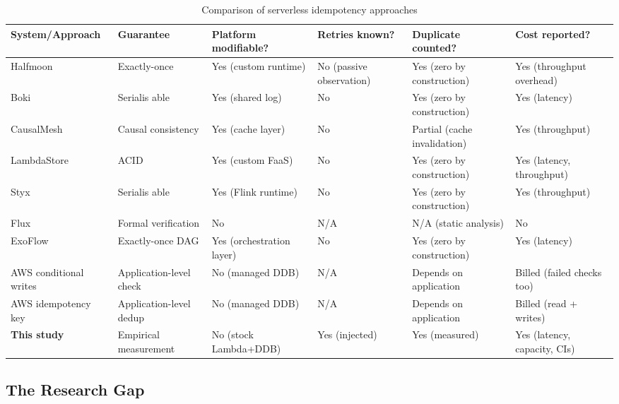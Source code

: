 \begin{table}[h]
\centering
\caption{Comparison of serverless idempotency approaches}
\label{tab:literature_comparison}
\begin{tabular}{p{3cm}p{3cm}p{2cm}p{2cm}p{2cm}p{2cm}}
\hline
\textbf{System/Approach} & \textbf{Guarantee} & \textbf{Platform modifiable?} & \textbf{Retries known?} & \textbf{Duplicate counted?} & \textbf{Cost reported?} \\
\hline
Halfmoon \citep{Qi2025Halfmoon} & Exactly-once & Yes (custom runtime) & No (passive observation) & Yes (zero by construction) & Yes (throughput overhead) \\
\hline
Boki \citep{Jia2024Boki} & Serialis able & Yes (shared log) & No & Yes (zero by construction) & Yes (latency) \\
\hline
CausalMesh \citep{Zhang2024CausalMesh} & Causal consistency & Yes (cache layer) & No & Partial (cache invalidation) & Yes (throughput) \\
\hline
LambdaStore \citep{Mast2026LambdaStore} & ACID & Yes (custom FaaS) & No & Yes (zero by construction) & Yes (latency, throughput) \\
\hline
Styx \citep{Psarakis2025Styx} & Serialis able & Yes (Flink runtime) & No & Yes (zero by construction) & Yes (throughput) \\
\hline
Flux \citep{Ding2023Flux} & Formal verification & No & N/A & N/A (static analysis) & No \\
\hline
ExoFlow \citep{Zhuang2023ExoFlow} & Exactly-once DAG & Yes (orchestration layer) & No & Yes (zero by construction) & Yes (latency) \\
\hline
AWS conditional writes \citep{AWSDynamoDBDocs} & Application-level check & No (managed DDB) & N/A & Depends on application & Billed (failed checks too) \\
\hline
AWS idempotency key \citep{AWSPowertoolsDocs} & Application-level dedup & No (managed DDB) & N/A & Depends on application & Billed (read + writes) \\
\hline
\textbf{This study} & Empirical measurement & No (stock Lambda+DDB) & Yes (injected) & Yes (measured) & Yes (latency, capacity, CIs) \\
\hline
\end{tabular}
\end{table}

\subsection{The Research Gap}

